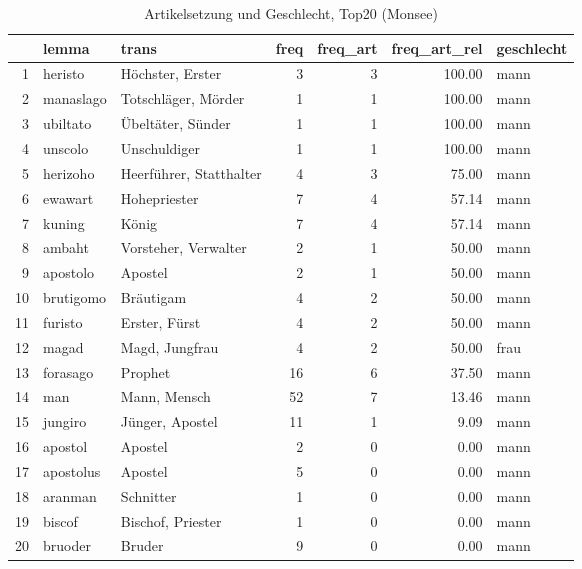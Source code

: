 \begin{table}[ht]
\centering
\begin{tabular}{rllrrrl}
  \hline
 & lemma & trans & freq & freq\_art & freq\_art\_rel & geschlecht \\ 
  \hline
1 & heristo & Höchster, Erster &   3 &   3 & 100.00 & mann \\ 
  2 & manaslago & Totschläger, Mörder &   1 &   1 & 100.00 & mann \\ 
  3 & ubiltato & Übeltäter, Sünder &   1 &   1 & 100.00 & mann \\ 
  4 & unscolo & Unschuldiger &   1 &   1 & 100.00 & mann \\ 
  5 & herizoho & Heerführer, Statthalter &   4 &   3 & 75.00 & mann \\ 
  6 & ewawart & Hohepriester &   7 &   4 & 57.14 & mann \\ 
  7 & kuning & König &   7 &   4 & 57.14 & mann \\ 
  8 & ambaht & Vorsteher, Verwalter &   2 &   1 & 50.00 & mann \\ 
  9 & apostolo & Apostel &   2 &   1 & 50.00 & mann \\ 
  10 & brutigomo & Bräutigam &   4 &   2 & 50.00 & mann \\ 
  11 & furisto & Erster, Fürst &   4 &   2 & 50.00 & mann \\ 
  12 & magad & Magd, Jungfrau &   4 &   2 & 50.00 & frau \\ 
  13 & forasago & Prophet &  16 &   6 & 37.50 & mann \\ 
  14 & man & Mann, Mensch &  52 &   7 & 13.46 & mann \\ 
  15 & jungiro & Jünger, Apostel &  11 &   1 & 9.09 & mann \\ 
  16 & apostol & Apostel &   2 &   0 & 0.00 & mann \\ 
  17 & apostolus & Apostel &   5 &   0 & 0.00 & mann \\ 
  18 & aranman & Schnitter &   1 &   0 & 0.00 & mann \\ 
  19 & biscof & Bischof, Priester &   1 &   0 & 0.00 & mann \\ 
  20 & bruoder & Bruder &   9 &   0 & 0.00 & mann \\ 
   \hline
\end{tabular}
\caption{Artikelsetzung und Geschlecht, Top20  (Monsee)} 
\end{table}
